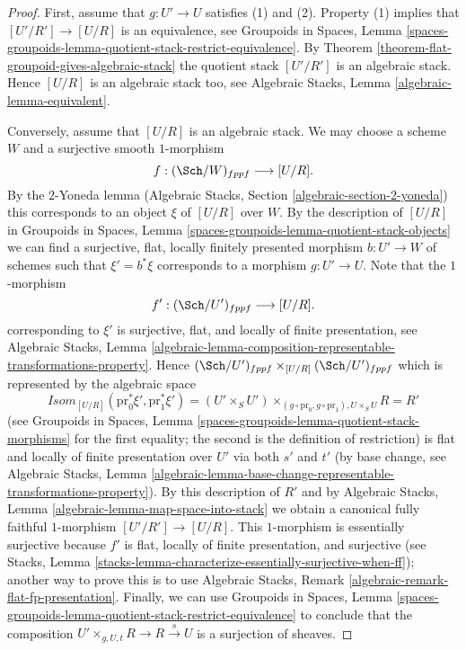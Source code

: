 \begin{proof}
First, assume that $g : U' \to U$ satisfies (1) and (2). Property (1)
implies that $[U'/R'] \to [U/R]$ is an equivalence, see
Groupoids in Spaces,
Lemma \ref{spaces-groupoids-lemma-quotient-stack-restrict-equivalence}.
By
Theorem \ref{theorem-flat-groupoid-gives-algebraic-stack}
the quotient stack $[U'/R']$ is an algebraic stack. Hence
$[U/R]$ is an algebraic stack too, see
Algebraic Stacks, Lemma \ref{algebraic-lemma-equivalent}.

\medskip\noindent
Conversely, assume that $[U/R]$ is an algebraic stack. We may choose a
scheme $W$ and a surjective smooth $1$-morphism
$$
f : (\Sch/W)_{fppf} \longrightarrow [U/R].
$$
By the $2$-Yoneda lemma
(Algebraic Stacks, Section \ref{algebraic-section-2-yoneda})
this corresponds to an object $\xi$ of $[U/R]$ over $W$.
By the description of $[U/R]$ in
Groupoids in Spaces, Lemma \ref{spaces-groupoids-lemma-quotient-stack-objects}
we can find a surjective, flat, locally finitely presented morphism
$b : U' \to W$ of schemes such that $\xi' = b^*\xi$ corresponds to a morphism
$g : U' \to U$. Note that the $1$-morphism
$$
f' : (\Sch/U')_{fppf} \longrightarrow [U/R].
$$
corresponding to $\xi'$ is surjective, flat, and locally of finite
presentation, see
Algebraic Stacks, Lemma
\ref{algebraic-lemma-composition-representable-transformations-property}.
Hence
$(\Sch/U')_{fppf} \times_{[U/R]} (\Sch/U')_{fppf}$
which is represented by the algebraic space
$$
\mathit{Isom}_{[U/R]}(\text{pr}_0^*\xi', \text{pr}_1^*\xi') =
(U' \times_S U')
\times_{(g \circ \text{pr}_0, g \circ \text{pr}_1), U \times_S U} R = R'
$$
(see
Groupoids in Spaces, Lemma
\ref{spaces-groupoids-lemma-quotient-stack-morphisms}
for the first equality; the second is the definition of restriction)
is flat and locally of finite presentation over $U'$ via both $s'$ and $t'$
(by base change, see
Algebraic Stacks, Lemma
\ref{algebraic-lemma-base-change-representable-transformations-property}).
By this description of $R'$ and by
Algebraic Stacks, Lemma \ref{algebraic-lemma-map-space-into-stack}
we obtain a canonical fully faithful $1$-morphism $[U'/R'] \to [U/R]$.
This $1$-morphism is essentially surjective because $f'$ is flat,
locally of finite presentation, and surjective (see
Stacks, Lemma \ref{stacks-lemma-characterize-essentially-surjective-when-ff});
another way to prove this is to use
Algebraic Stacks, Remark
\ref{algebraic-remark-flat-fp-presentation}.
Finally, we can use
Groupoids in Spaces, Lemma
\ref{spaces-groupoids-lemma-quotient-stack-restrict-equivalence}
to conclude that the composition
$U' \times_{g, U, t} R \to R \xrightarrow{s} U$ is a surjection of sheaves.
\end{proof}

